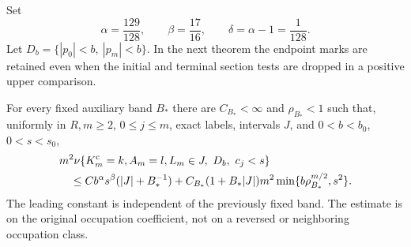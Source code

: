 Set
\begin{equation}\label{eq:v81-exponents}
              \alpha=\frac{129}{128},\qquad
              \beta=\frac{17}{16},\qquad
              \delta=\alpha-1=\frac1{128}.
\end{equation}
Let $D_b=\{|p_0|<b,\ |p_m|<b\}$. In the next theorem the endpoint
marks are retained even when the initial and terminal section tests
are dropped in a positive upper comparison.

\begin{theorem}
\label{thm:v81-joint-local}
For every fixed auxiliary band $B_*$ there are $C_{B_*}<\infty$ and
$\rho_{B_*}<1$ such that, uniformly in $R,m\ge2$, $0\le j\le m$,
exact labels, intervals $J$, and $0<b<b_0$, $0<s<s_0$,
\begin{align}
 &m^2\nu\{K_m^{\rm c}=k,A_m=l,L_m\in J,\ D_b,\ c_j<s\}
                                                        \notag\\
 &\quad\le Cb^\alpha s^\beta(|J|+B_*^{-1})
   +C_{B_*}(1+B_*|J|)m^2
                   \min\{b\rho_{B_*}^{m/2},s^2\}.
                                      \label{eq:v81-joint-local}
\end{align}
The leading constant is independent of the previously fixed band.
The estimate is on the original occupation coefficient, not on a
reversed or neighboring occupation class.
\end{theorem}
